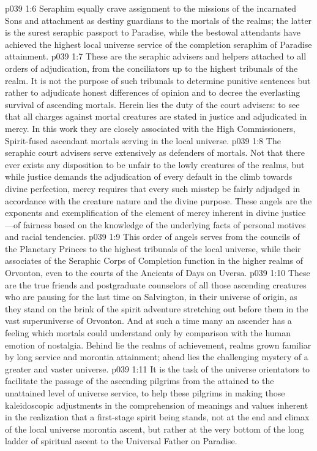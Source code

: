 \vs p039 1:6 Seraphim equally crave assignment to the missions of the incarnated Sons and attachment as destiny guardians to the mortals of the realms; the latter is the surest seraphic passport to Paradise, while the bestowal attendants have achieved the highest local universe service of the completion seraphim of Paradise attainment.
\pc \vs p039 1:7 \bibnobreakspace {} These are the seraphic advisers and helpers attached to all orders of adjudication, from the conciliators up to the highest tribunals of the realm. It is not the purpose of such tribunals to determine punitive sentences but rather to adjudicate honest differences of opinion and to decree the everlasting survival of ascending mortals. Herein lies the duty of the court advisers: to see that all charges against mortal creatures are stated in justice and adjudicated in mercy. In this work they are closely associated with the High Commissioners, Spirit\hyp{}fused ascendant mortals serving in the local universe.
\vs p039 1:8 The seraphic court advisers serve extensively as defenders of mortals. Not that there ever exists any disposition to be unfair to the lowly creatures of the realms, but while justice demands the adjudication of every default in the climb towards divine perfection, mercy requires that every such misstep be fairly adjudged in accordance with the creature nature and the divine purpose. These angels are the exponents and exemplification of the element of mercy inherent in divine justice---of fairness based on the knowledge of the underlying facts of personal motives and racial tendencies.
\vs p039 1:9 This order of angels serves from the councils of the Planetary Princes to the highest tribunals of the local universe, while their associates of the Seraphic Corps of Completion function in the higher realms of Orvonton, even to the courts of the Ancients of Days on Uversa.
\pc \vs p039 1:10 \bibnobreakspace {} These are the true friends and postgraduate counselors of all those ascending creatures who are pausing for the last time on Salvington, in their universe of origin, as they stand on the brink of the spirit adventure stretching out before them in the vast superuniverse of Orvonton. And at such a time many an ascender has a feeling which mortals could understand only by comparison with the human emotion of nostalgia. Behind lie the realms of achievement, realms grown familiar by long service and morontia attainment; ahead lies the challenging mystery of a greater and vaster universe.
\vs p039 1:11 It is the task of the universe orientators to facilitate the passage of the ascending pilgrims from the attained to the unattained level of universe service, to help these pilgrims in making those kaleidoscopic adjustments in the comprehension of meanings and values inherent in the realization that a first\hyp{}stage spirit being stands, not at the end and climax of the local universe morontia ascent, but rather at the very bottom of the long ladder of spiritual ascent to the Universal Father on Paradise.
